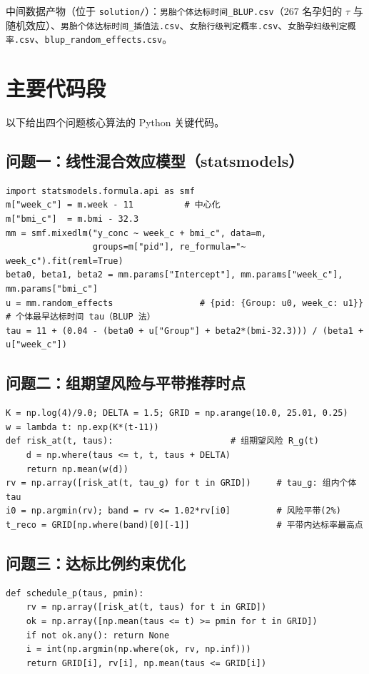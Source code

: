 \documentclass[11pt,a4paper]{ctexart}
\begin{document}
中间数据产物（位于 \texttt{solution/}）：\texttt{男胎个体达标时间\_BLUP.csv}（267 名孕妇的 $\tau$ 与随机效应）、\texttt{男胎个体达标时间\_插值法.csv}、\texttt{女胎行级判定概率.csv}、\texttt{女胎孕妇级判定概率.csv}、\texttt{blup\_random\_effects.csv}。

\section{主要代码段}
以下给出四个问题核心算法的 Python 关键代码。

\subsection{问题一：线性混合效应模型（statsmodels）}
{\footnotesize\begin{verbatim}
import statsmodels.formula.api as smf
m["week_c"] = m.week - 11          # 中心化
m["bmi_c"]  = m.bmi - 32.3
mm = smf.mixedlm("y_conc ~ week_c + bmi_c", data=m,
                 groups=m["pid"], re_formula="~ week_c").fit(reml=True)
beta0, beta1, beta2 = mm.params["Intercept"], mm.params["week_c"], mm.params["bmi_c"]
u = mm.random_effects                 # {pid: {Group: u0, week_c: u1}}
# 个体最早达标时间 tau（BLUP 法）
tau = 11 + (0.04 - (beta0 + u["Group"] + beta2*(bmi-32.3))) / (beta1 + u["week_c"])
\end{verbatim}}

\subsection{问题二：组期望风险与平带推荐时点}
{\footnotesize\begin{verbatim}
K = np.log(4)/9.0; DELTA = 1.5; GRID = np.arange(10.0, 25.01, 0.25)
w = lambda t: np.exp(K*(t-11))
def risk_at(t, taus):                       # 组期望风险 R_g(t)
    d = np.where(taus <= t, t, taus + DELTA)
    return np.mean(w(d))
rv = np.array([risk_at(t, tau_g) for t in GRID])     # tau_g: 组内个体 tau
i0 = np.argmin(rv); band = rv <= 1.02*rv[i0]         # 风险平带(2%)
t_reco = GRID[np.where(band)[0][-1]]                 # 平带内达标率最高点
\end{verbatim}}

\subsection{问题三：达标比例约束优化}
{\footnotesize\begin{verbatim}
def schedule_p(taus, pmin):
    rv = np.array([risk_at(t, taus) for t in GRID])
    ok = np.array([np.mean(taus <= t) >= pmin for t in GRID])
    if not ok.any(): return None
    i = int(np.argmin(np.where(ok, rv, np.inf)))
    return GRID[i], rv[i], np.mean(taus <= GRID[i])
\end{verbatim}}
\end{document}

